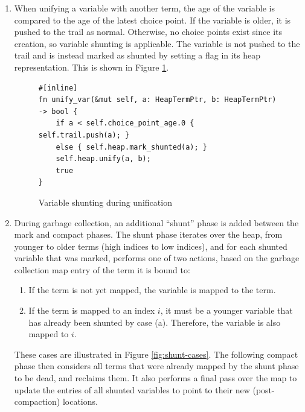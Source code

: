 \begin{enumerate}
\item When unifying a variable with another term, the age of the variable is compared to the age of the latest choice point. If the variable is older, it is pushed to the trail as normal. Otherwise, no choice points exist since its creation, so variable shunting is applicable. The variable is not pushed to the trail and is instead marked as shunted by setting a flag in its heap representation. This is shown in Figure \ref{fig:unify-var}.

\begin{figure}[H]
\centering
\begin{verbatim}
#[inline]
fn unify_var(&mut self, a: HeapTermPtr, b: HeapTermPtr) -> bool {
    if a < self.choice_point_age.0 { self.trail.push(a); }
    else { self.heap.mark_shunted(a); }
    self.heap.unify(a, b);
    true
}
\end{verbatim}
\caption{Variable shunting during unification}
\label{fig:unify-var}
\end{figure}

\item During garbage collection, an additional ``shunt'' phase is added between the mark and compact phases. The shunt phase iterates over the heap, from younger to older terms (high indices to low indices), and for each shunted variable that was marked, performs one of two actions, based on the garbage collection map entry of the term it is bound to:
\begin{enumerate}
\item If the term is not yet mapped, the variable is mapped to the term.
\item If the term is mapped to an index $i$, it must be a younger variable that has already been shunted by case (a). Therefore, the variable is also mapped to $i$.
\end{enumerate}

These cases are illustrated in Figure \ref{fig:shunt-cases}. The following compact phase then considers all terms that were already mapped by the shunt phase to be dead, and reclaims them. It also performs a final pass over the map to update the entries of all shunted variables to point to their new (post-compaction) locations.

\begin{figure}[H]
\centering
{}
\end{figure}
\end{enumerate}
